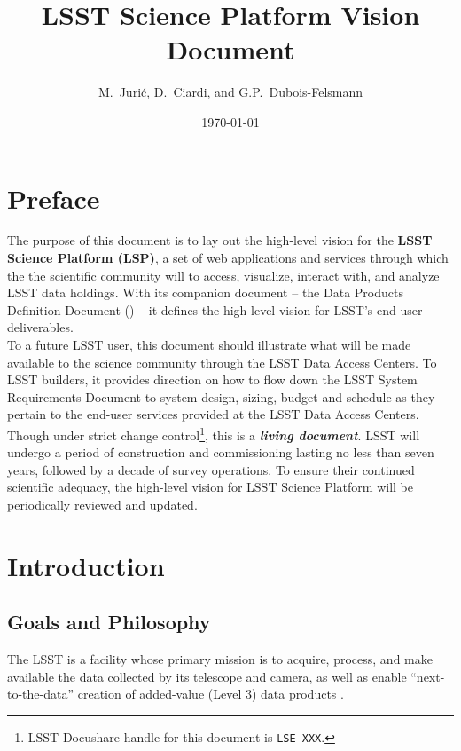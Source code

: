 \documentclass[DM,lsstdraft,toc]{lsstdoc}
\title[LSST Science Platform]{LSST Science Platform Vision Document}
\author{
M.~Juri\'c,
D.~Ciardi,
and
G.P.~Dubois-Felsmann
}
\date{\today}
\begin{document}
\maketitle

\section{Preface}

The purpose of this document is to lay out the high-level vision for the {\bf LSST Science Platform (LSP)}, a set of web applications and services through which the the scientific community will to access, visualize, interact with, and analyze LSST data holdings. With its companion document -- the Data Products Definition Document (\DPDD) -- it defines the high-level vision for LSST's end-user deliverables.
\\

To a future LSST user, this document should illustrate what will be made available to the science community through the LSST Data Access Centers. To LSST builders, it provides direction on how to flow down the LSST System Requirements Document to system design, sizing, budget and schedule as they pertain to the end-user services provided at the LSST Data Access Centers.
\\

Though under strict change control\footnote{LSST Docushare handle for this document is {\tt LSE-XXX}.}, this is a {\bf \em living document}. LSST will undergo a period of construction  and commissioning lasting no less than seven years, followed by a decade of survey operations. To ensure their continued scientific adequacy, the high-level vision for LSST Science Platform will be periodically reviewed and updated.

\clearpage

\section{Introduction}

\subsection{Goals and Philosophy}

The LSST is a facility whose primary mission is to acquire, process, and
make available the data collected by its telescope and camera, as well as
enable ``next-to-the-data'' creation of added-value (Level 3) data products
\cite{SRD}.
\end{document}
